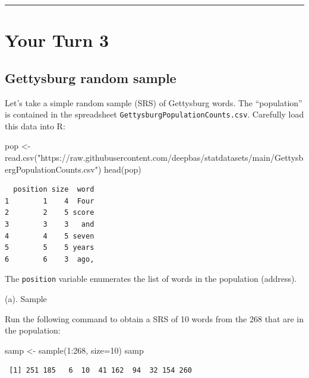 \documentclass[
]{book}
\newenvironment{Shaded}{\begin{snugshade}}{\end{snugshade}}
\newcommand{\AttributeTok}[1]{\textcolor[rgb]{0.77,0.63,0.00}{#1}}
\newcommand{\DecValTok}[1]{\textcolor[rgb]{0.00,0.00,0.81}{#1}}
\newcommand{\FunctionTok}[1]{\textcolor[rgb]{0.00,0.00,0.00}{#1}}
\newcommand{\NormalTok}[1]{#1}
\newcommand{\OtherTok}[1]{\textcolor[rgb]{0.56,0.35,0.01}{#1}}
\newcommand{\SpecialCharTok}[1]{\textcolor[rgb]{0.00,0.00,0.00}{#1}}
\newcommand{\StringTok}[1]{\textcolor[rgb]{0.31,0.60,0.02}{#1}}
\begin{document}
\begin{center}\rule{0.5\linewidth}{0.5pt}\end{center}

\hypertarget{your-turn-3}{%
\section{Your Turn 3}\label{your-turn-3}}

\hypertarget{gettysburg-random-sample}{%
\subsection{Gettysburg random sample}\label{gettysburg-random-sample}}

Let's take a simple random sample (SRS) of Gettysburg words. The ``population'' is contained in the
spreadsheet \texttt{GettysburgPopulationCounts.csv}. Carefully load this data into R:

\begin{Shaded}
\begin{Highlighting}[]
\NormalTok{pop }\OtherTok{\textless{}{-}} \FunctionTok{read.csv}\NormalTok{(}\StringTok{"https://raw.githubusercontent.com/deepbas/statdatasets/main/GettysbergPopulationCounts.csv"}\NormalTok{)}
\FunctionTok{head}\NormalTok{(pop)}
\end{Highlighting}
\end{Shaded}

\begin{verbatim}
  position size  word
1        1    4  Four
2        2    5 score
3        3    3   and
4        4    5 seven
5        5    5 years
6        6    3  ago,
\end{verbatim}

The \texttt{position} variable enumerates the list of words in the population (address).

(a). Sample

Run the following command to obtain a SRS of 10 words from the 268 that are in the population:

\begin{Shaded}
\begin{Highlighting}[]
\NormalTok{samp }\OtherTok{\textless{}{-}} \FunctionTok{sample}\NormalTok{(}\DecValTok{1}\SpecialCharTok{:}\DecValTok{268}\NormalTok{, }\AttributeTok{size=}\DecValTok{10}\NormalTok{)}
\NormalTok{samp}
\end{Highlighting}
\end{Shaded}

\begin{verbatim}
 [1] 251 185   6  10  41 162  94  32 154 260
\end{verbatim}
\end{document}
